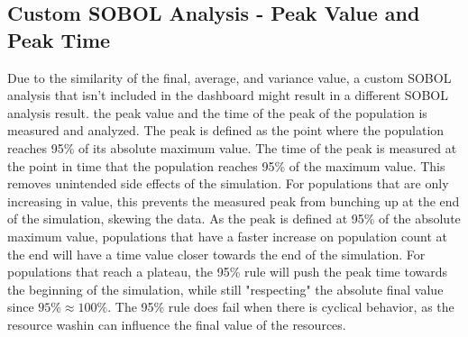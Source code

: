 \subsection{Custom SOBOL Analysis - Peak Value and Peak Time}
Due to the similarity of the final, average, and variance value, a custom SOBOL analysis that isn't included in the dashboard might result in a different SOBOL analysis result. 
the peak value and the time of the peak of the population is measured and analyzed. 
The peak is defined as the point where the population reaches 95\% of its absolute maximum value. 
The time of the peak is measured at the point in time that the population reaches 95\% of the maximum value. 
This removes unintended side effects of the simulation. 
For populations that are only increasing in value, this prevents the measured peak from bunching up at the end of the simulation, skewing the data. 
As the peak is defined at 95\% of the absolute maximum value, populations that have a faster increase on population count at the end will have a time value closer towards the end of the simulation. 
For populations that reach a plateau, the 95\% rule will push the peak time towards the beginning of the simulation, while still "respecting" the absolute final value since $95\% \approx 100\%$. 
The 95\% rule does fail when there is cyclical behavior, as the resource washin can influence the final value of the resources. 
